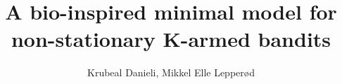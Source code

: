 \documentclass{article}
\begin{document}
\title{A bio-inspired minimal model for non-stationary K-armed bandits}
\author{Krubeal Danieli, Mikkel Elle Lepperød}

\maketitle

\newpage

\tableofcontents

\newpage










\newpage







\newpage


\end{document}
